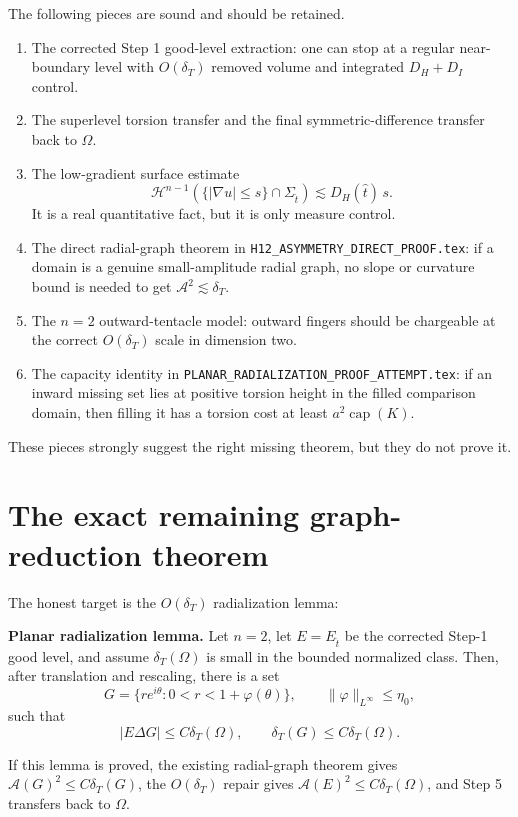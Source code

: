 \documentclass[11pt]{article}
\newcommand{\Om}{\Omega}
\newcommand{\dT}{\delta_T}
\newcommand{\A}{\mathcal A}
\newcommand{\Ht}{\widehat t}
\newcommand{\Et}{E_{\widehat t}}
\begin{document}
The following pieces are sound and should be retained.

\begin{enumerate}[label=\arabic*.]
\item The corrected Step 1 good-level extraction: one can stop at a regular
near-boundary level with \(O(\dT)\) removed volume and integrated
\(D_H+D_I\) control.
\item The superlevel torsion transfer and the final symmetric-difference
transfer back to \(\Om\).
\item The low-gradient surface estimate
\[
   \mathcal H^{n-1}(\{|\nabla u|\le s\}\cap\Sigma_{\Ht})
      \lesssim D_H(\Ht)\,s.
\]
It is a real quantitative fact, but it is only measure control.
\item The direct radial-graph theorem in
\texttt{H12\_ASYMMETRY\_DIRECT\_PROOF.tex}: if a domain is a genuine
small-amplitude radial graph, no slope or curvature bound is needed to get
\(\A^2\lesssim \dT\).
\item The \(n=2\) outward-tentacle model: outward fingers should be chargeable
at the correct \(O(\dT)\) scale in dimension two.
\item The capacity identity in
\texttt{PLANAR\_RADIALIZATION\_PROOF\_ATTEMPT.tex}: if an inward missing set
lies at positive torsion height in the filled comparison domain, then filling
it has a torsion cost at least \(a^2\operatorname{cap}(K)\).
\end{enumerate}

These pieces strongly suggest the right missing theorem, but they do not prove
it.

\section{The exact remaining graph-reduction theorem}

The honest target is the \(O(\dT)\) radialization lemma:

\medskip
\noindent
\textbf{Planar radialization lemma.}
Let \(n=2\), let \(E=\Et\) be the corrected Step-1 good level, and assume
\(\dT(\Om)\) is small in the bounded normalized class.  Then, after translation
and rescaling, there is a set
\[
   G=\{re^{i\theta}:0<r<1+\varphi(\theta)\},
   \qquad
   \|\varphi\|_{L^\infty}\le \eta_0,
\]
such that
\[
   |E\Delta G|\le C\dT(\Om),
   \qquad
   \dT(G)\le C\dT(\Om).
\]

If this lemma is proved, the existing radial-graph theorem gives
\(\A(G)^2\le C\dT(G)\), the \(O(\dT)\) repair gives
\(\A(E)^2\le C\dT(\Om)\), and Step 5 transfers back to \(\Om\).
\end{document}

